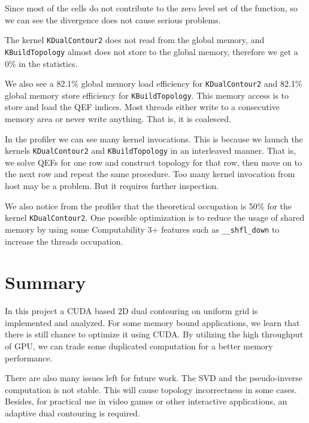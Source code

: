 \documentclass[a4paper,12pt]{article}
\begin{document}
Since most of the cells do not contribute to the zero level set
of the function, so we can see the divergence does not cause serious problems.

The kernel \texttt{KDualContour2} does not read from the global memory,
and \texttt{KBuildTopology} almost does not store to the global memory,
therefore we get a 0\% in the statistics.

We also see a 82.1\% global memory load efficiency
for \texttt{KDualContour2} and 82.1\% global memory store efficiency for
\texttt{KBuildTopology}.
This memory access is to store and load the QEF indices.
Most threads either write to a consecutive memory area or never write anything.
That is, it is coalesced.

In the profiler we can see many kernel invocations.
This is because we launch the kernels \texttt{KDualContour2} and
\texttt{KBuildTopology}
in an interleaved manner.
That is, we solve QEFs for one row and construct topology for that row,
then move on to the next row and repeat the same procedure.
Too many kernel invocation from host may be a problem.
But it requires further inspection.

We also notice from the profiler that the theoretical occupation is 50\%
for the kernel \texttt{KDualContour2}.
One possible optimization is to reduce the usage of shared memory
by using some Computability 3+ features such as \texttt{\_\_shfl\_down}
to increase the threads occupation.

\section{Summary}

In this project a CUDA based 2D dual contouring on uniform grid
is implemented and analyzed.
For some memory bound applications,
we learn that there is still chance to optimize it using CUDA.
By utilizing the high throughput of GPU,
we can trade some duplicated computation for a better memory performance.

There are also many issues left for future work.
The SVD and the pseudo-inverse computation is not stable.
This will cause topology incorrectness in some cases.
Besides, for practical use in video games or other interactive applications,
an adaptive dual contouring is required.

\newpage
{}


\end{document}
